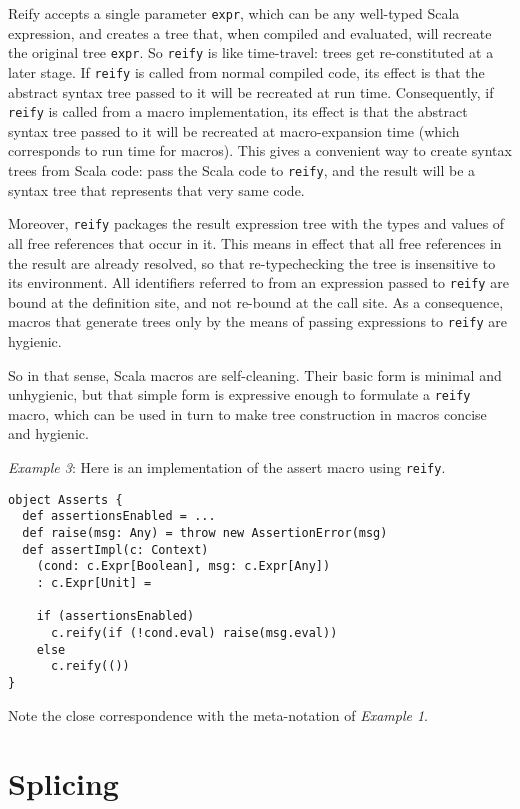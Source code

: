 \documentclass{llncs}
\begin{document}
Reify accepts a single parameter \lstinline$expr$, which can be any well-typed Scala expression, and creates a tree that, when compiled and evaluated, will recreate the original tree \lstinline$expr$. So \lstinline$reify$ is like time-travel: trees get re-constituted at a later stage. If \lstinline$reify$ is called from normal compiled code, its effect is that the abstract syntax tree passed to it will be recreated at run time. Consequently, if \lstinline$reify$ is called from a macro implementation, its effect is that the abstract syntax tree passed to it will be recreated at macro-expansion time (which corresponds to run time for macros). This gives a convenient way to create syntax trees from Scala code: pass the Scala code to \lstinline$reify$, and the result will be a syntax tree that represents that very same code.

Moreover, \lstinline$reify$ packages the result expression tree with the types and values of all free references that occur in it. This means in effect that all free references in the result are already resolved, so that re-typechecking the tree is insensitive to its environment. All identifiers referred to from an expression passed to \lstinline$reify$ are bound at the definition site, and not re-bound at the call site. As a consequence, macros that generate trees only by the means of passing expressions to \lstinline$reify$ are hygienic.

So in that sense, Scala macros are self-cleaning. Their basic form is minimal and unhygienic, but that simple form is expressive enough to formulate a \lstinline$reify$ macro, which can be used in turn to make tree construction in macros concise and hygienic.

\emph{Example 3}: Here is an implementation of the assert macro using \lstinline$reify$.

\begin{lstlisting}
object Asserts {
  def assertionsEnabled = ...
  def raise(msg: Any) = throw new AssertionError(msg)
  def assertImpl(c: Context)
    (cond: c.Expr[Boolean], msg: c.Expr[Any])
    : c.Expr[Unit] =

    if (assertionsEnabled)
      c.reify(if (!cond.eval) raise(msg.eval))
    else
      c.reify(())
}
\end{lstlisting}

\noindent
Note the close correspondence with the meta-notation of \emph{Example 1}.
\noindent

\section{Splicing}
\end{document}
